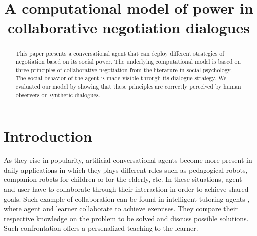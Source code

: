 \documentclass{llncs}
\begin{document}
		\title{\vskip -10pt A computational model of power in collaborative negotiation dialogues}
		
		\author{}
		\institute{}
		
		\maketitle
		
		\begin{abstract}
			This paper presents a conversational agent that can deploy different strategies of negotiation based on its social power. The underlying computational model is based on three principles of collaborative negotiation from the literature in social psychology. The social behavior of the agent is made visible through its dialogue strategy. We evaluated our model by showing that these principles are correctly perceived by human observers on synthetic dialogues.
		\end{abstract}
		
		\section{Introduction}
		
		As they rise in popularity, artificial conversational agents become more present in daily applications in which they plays different roles such as pedagogical robots, companion robots for children or for the elderly, etc. In these situations, agent and user have to collaborate through their interaction in order to achieve shared goals. Such example of collaboration can be found in intelligent tutoring agents \cite{kerly2008calmsystem}, where agent and learner collaborate to achieve exercises. They compare their respective knowledge on the problem to be solved and discuss possible solutions. Such confrontation offers a personalized teaching to the learner.
		
\end{document}
